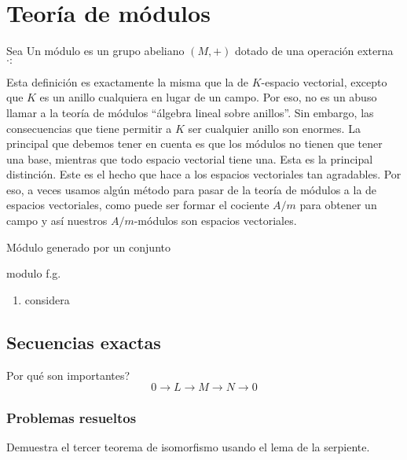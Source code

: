 \documentclass[b5paper,10pt]{book}
\begin{document}
\chapter{Teoría de módulos}

\begin{defi}
Sea 
Un módulo es un grupo abeliano \((M,+)\) dotado de una operación externa
\(\cdot: 	\)
\end{defi}

Esta definición es exactamente la misma que la de \(K\)-espacio vectorial,
excepto que \(K\) es un anillo cualquiera en lugar de un campo.
Por eso, no es un abuso llamar a la teoría de módulos 
``álgebra lineal sobre anillos''.
Sin embargo, 
las consecuencias que tiene permitir a \(K\) ser cualquier anillo
son enormes.
La principal que debemos tener en cuenta es que 
los módulos no tienen que tener una base, mientras
que todo espacio vectorial tiene una.
Esta es la principal distinción.
Este es el hecho que hace a los espacios vectoriales tan agradables.
Por eso, a veces usamos algún método
para pasar de la teoría de módulos a la de
espacios vectoriales, como puede ser 
formar el cociente \(A/m\) para obtener un campo
y así nuestros \(A/m\)-módulos son espacios vectoriales.

\begin{defi}
Módulo generado por un conjunto
\end{defi}

\begin{defi}
modulo f.g.
\end{defi}

\begin{ej}
\begin{enumerate}[label=(i)]
	\item considera
\end{enumerate}
\end{ej}

\section{Secuencias exactas}

Por qué son importantes?
\[
0\to L \to M\to N\to 0
\]

\subsection{Problemas resueltos}

\begin{problema}
Demuestra el tercer teorema de isomorfismo usando el lema de la serpiente.
\end{problema}
\end{document}
